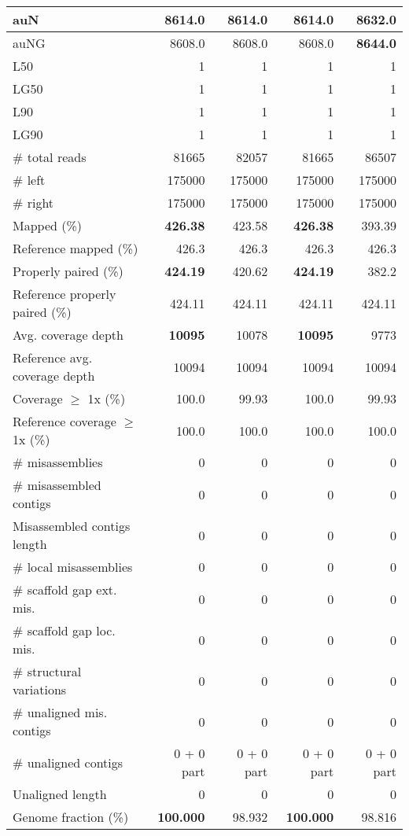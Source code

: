 \documentclass[12pt,a4paper]{article}
\begin{document}
\begin{table}[ht]
\begin{center}
\begin{tabular}{|l*{4}{|r}|}
auN & 8614.0 & 8614.0 & 8614.0 & {\bf 8632.0} \\ \hline
auNG & 8608.0 & 8608.0 & 8608.0 & {\bf 8644.0} \\ \hline
L50 & 1 & 1 & 1 & 1 \\ \hline
LG50 & 1 & 1 & 1 & 1 \\ \hline
L90 & 1 & 1 & 1 & 1 \\ \hline
LG90 & 1 & 1 & 1 & 1 \\ \hline
\# total reads & 81665 & 82057 & 81665 & 86507 \\ \hline
\# left & 175000 & 175000 & 175000 & 175000 \\ \hline
\# right & 175000 & 175000 & 175000 & 175000 \\ \hline
Mapped (\%) & {\bf 426.38} & 423.58 & {\bf 426.38} & 393.39 \\ \hline
Reference mapped (\%) & 426.3 & 426.3 & 426.3 & 426.3 \\ \hline
Properly paired (\%) & {\bf 424.19} & 420.62 & {\bf 424.19} & 382.2 \\ \hline
Reference properly paired (\%) & 424.11 & 424.11 & 424.11 & 424.11 \\ \hline
Avg. coverage depth & {\bf 10095} & 10078 & {\bf 10095} & 9773 \\ \hline
Reference avg. coverage depth & 10094 & 10094 & 10094 & 10094 \\ \hline
Coverage $\geq$ 1x (\%) & 100.0 & 99.93 & 100.0 & 99.93 \\ \hline
Reference coverage $\geq$ 1x (\%) & 100.0 & 100.0 & 100.0 & 100.0 \\ \hline
\# misassemblies & 0 & 0 & 0 & 0 \\ \hline
\# misassembled contigs & 0 & 0 & 0 & 0 \\ \hline
Misassembled contigs length & 0 & 0 & 0 & 0 \\ \hline
\# local misassemblies & 0 & 0 & 0 & 0 \\ \hline
\# scaffold gap ext. mis. & 0 & 0 & 0 & 0 \\ \hline
\# scaffold gap loc. mis. & 0 & 0 & 0 & 0 \\ \hline
\# structural variations & 0 & 0 & 0 & 0 \\ \hline
\# unaligned mis. contigs & 0 & 0 & 0 & 0 \\ \hline
\# unaligned contigs & 0 + 0 part & 0 + 0 part & 0 + 0 part & 0 + 0 part \\ \hline
Unaligned length & 0 & 0 & 0 & 0 \\ \hline
Genome fraction (\%) & {\bf 100.000} & 98.932 & {\bf 100.000} & 98.816 \\ \hline

\end{tabular}
\end{center}
\end{table}
\end{document}
